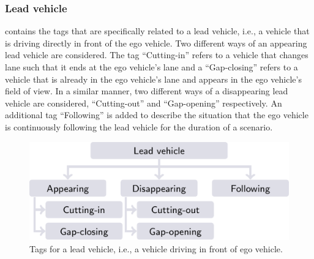 \subsubsection{Lead vehicle}
\label{sec:lead vehicle}

 contains the tags that are specifically related to a lead vehicle, i.e., a vehicle that is driving directly in front of the ego vehicle. Two different ways of an appearing lead vehicle are considered. The tag ``Cutting-in'' refers to a vehicle that changes lane such that it ends at the ego vehicle's lane and a ``Gap-closing'' refers to a vehicle that is already in the ego vehicle's lane and appears in the ego vehicle's field of view. In a similar manner, two different ways of a disappearing lead vehicle are considered, ``Cutting-out'' and ``Gap-opening'' respectively. An additional tag ``Following'' is added to describe the situation that the ego vehicle is continuously following the lead vehicle for the duration of a scenario.

\begin{figure}
	\centering
	\includegraphics{figures/lead_vehicle}
	\caption{Tags for a lead vehicle, i.e., a vehicle driving in front of ego vehicle.}
	\label{fig:tree lead vehicle}
\end{figure}




%
%



